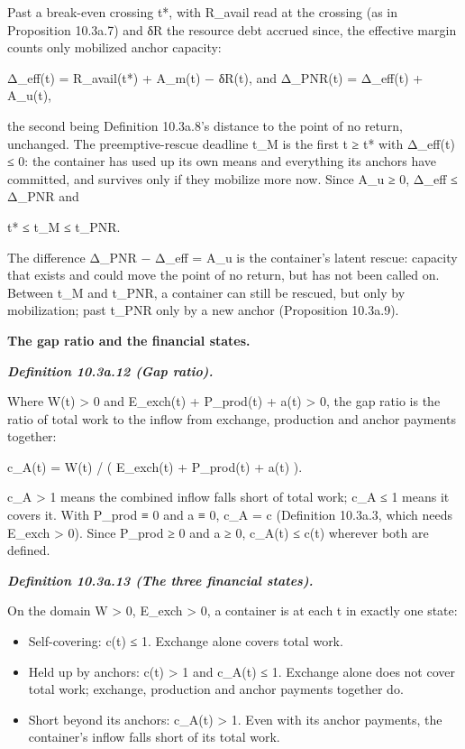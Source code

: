 \documentclass[
]{article}
\begin{document}
Past a break-even crossing t*, with R\_avail read at the crossing (as in
Proposition 10.3a.7) and δR the resource debt accrued since, the
effective margin counts only mobilized anchor capacity:

Δ\_eff(t) = R\_avail(t*) + A\_m(t) − δR(t), and Δ\_PNR(t) = Δ\_eff(t) +
A\_u(t),

the second being Definition 10.3a.8's distance to the point of no
return, unchanged. The preemptive-rescue deadline t\_M is the first t ≥
t* with Δ\_eff(t) ≤ 0: the container has used up its own means and
everything its anchors have committed, and survives only if they
mobilize more now. Since A\_u ≥ 0, Δ\_eff ≤ Δ\_PNR and

t* ≤ t\_M ≤ t\_PNR.

The difference Δ\_PNR − Δ\_eff = A\_u is the container's latent rescue:
capacity that exists and could move the point of no return, but has not
been called on. Between t\_M and t\_PNR, a container can still be
rescued, but only by mobilization; past t\_PNR only by a new anchor
(Proposition 10.3a.9).

\textbf{The gap ratio and the financial states.}

\emph{\textbf{Definition 10.3a.12 (Gap ratio).}}

Where W(t) \textgreater{} 0 and E\_exch(t) + P\_prod(t) + a(t)
\textgreater{} 0, the gap ratio is the ratio of total work to the inflow
from exchange, production and anchor payments together:

c\_A(t) = W(t) / ( E\_exch(t) + P\_prod(t) + a(t) ).

c\_A \textgreater{} 1 means the combined inflow falls short of total
work; c\_A ≤ 1 means it covers it. With P\_prod ≡ 0 and a ≡ 0, c\_A = c
(Definition 10.3a.3, which needs E\_exch \textgreater{} 0). Since
P\_prod ≥ 0 and a ≥ 0, c\_A(t) ≤ c(t) wherever both are defined.

\emph{\textbf{Definition 10.3a.13 (The three financial states).}}

On the domain W \textgreater{} 0, E\_exch \textgreater{} 0, a container
is at each t in exactly one state:

\begin{itemize}
\item
  Self-covering: c(t) ≤ 1. Exchange alone covers total work.
\item
  Held up by anchors: c(t) \textgreater{} 1 and c\_A(t) ≤ 1. Exchange
  alone does not cover total work; exchange, production and anchor
  payments together do.
\item
  Short beyond its anchors: c\_A(t) \textgreater{} 1. Even with its
  anchor payments, the container's inflow falls short of its total work.
\end{itemize}
\end{document}
